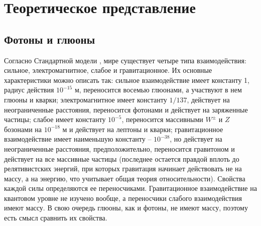 \documentclass[12pt, a4paper]{article}
\begin{document}
\section{Теоретическое представление}
\subsection{Фотоны и глюоны}

Согласно Стандартной модели \cite{std_model}, мире существует четыре типа взаимодействия: сильное, электромагнитное, слабое и гравитационное. Их основные характеристики можно описать так: сильное взаимодействие имеет константу 1, радиус действия $10^{-15}$ м, переносится восемью глюонами, а участвуют в нем глюоны и кварки; электромагнитное имеет константу $1/137$, действует на неограниченные расстояния, переносится фотонами и действует на заряженные частицы; слабое имеет константу $10^{-5}$, переносится массивными $W^\pm$ и $Z$ бозонами на $10^{-18}$ м и действует на лептоны и кварки; гравитационное взаимодействие имеет наименьшую константу -- $10^{-38}$, но действует на неограниченные расстояния, предположительно, переносится гравитоном и действует на все массивные частицы (последнее остается правдой вплоть до релятивистских энергий, при которых гравитация начинает действовать не на массу, а на энергию, что учитывает общая теория относительности). Свойства каждой силы определяются ее переносчиками. Гравитационное взаимодействие на квантовом уровне не изучено вообще, а переносчики слабого взаимодействия имеют массу. В свою очередь глюоны, как и фотоны, не имеют массу, поэтому есть смысл сравнить их свойства.

\end{document}
